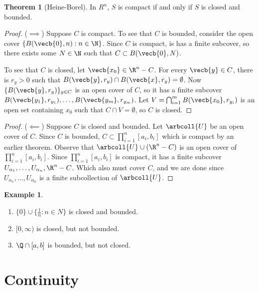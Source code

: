 \documentclass[a5paper]{article}
\theoremstyle{definition}%
\newtheorem{theorem}{Theorem}
\newtheorem*{example*}{Example}
\numberwithin{exercise}{section}
\theoremstyle{remark}%
\begin{document}
\begin{highlight}
\begin{theorem}[Heine-Borel]
In $R^n$, $S$ is compact if and only if $S$ is closed and bounded. 
\end{theorem}
\end{highlight}
\begin{proof}($\implies$)
Suppose $C$ is compact. To see that $C$ is bounded, consider the open cover $\{B(\vecb{0},n):n\in \N\}$. Since $C$ is compact, is has a finite subcover, so there exists some $N\in \N$ such that $C\subset B(\vecb{0},N)$.

To see that $C$ is closed, let $\vecb{x_0}\in \R^n-C$. 
For every $\vecb{y}\in C$, there is $r_y>0$ such that $B(\vecb{y},r_y)\cap B(\vecb{x},r_y)=\emptyset$. Now $\{B(\vecb{y}, r_y)\}_{y\in C}$ is an open cover of $C$, so it has a finite subcover $B(\vecb{y_1}, r_{y_1}), \ldots, B(\vecb{y_m}, r_{y_m})$. Let $V=\bigcap_{i=1}^m B(\vecb{x_0}, r_{y_i})$ is an open set containing $x_0$ such that $C\cap V=\emptyset$, so $C$ is closed. 
\end{proof}
\begin{proof}($\impliedby$)
Suppose $C$ is closed and bounded. 
Let $\arbcoll{U}$ be an open cover of $C$. Since $C$ is bounded, $C\subset \prod\limits_{i=1}^n[a_i, b_i]$ which is compact by an earlier theorem. Observe that $\arbcoll{U}\cup (\R^n-C)$ is an open cover of $\prod\limits_{i=1}^n[a_i, b_i]$. Since $\prod\limits_{i=1}^n[a_i, b_i]$ is compact, it has a finite subcover $U_{\alpha_1}, \ldots, U_{\alpha_n}, \R^n-C$. Which also must cover $C$, and we are done since $U_{\alpha_1}, \ldots, U_{\alpha_n}$ is a finite subcollection of $\arbcoll{U}$. 
\end{proof}

\begin{example*}\mbox{}
\begin{enumerate}
\item $\{0\}\cup\{\frac{1}{n}:n\in N\}$ is closed and bounded. 

\item $[0,\infty)$ is closed, but not bounded. 

\item $\Q\cap [a,b]$ is bounded, but not closed. 
\end{enumerate}
\end{example*}

\pagebreak
\section{Continuity}
\end{document}
